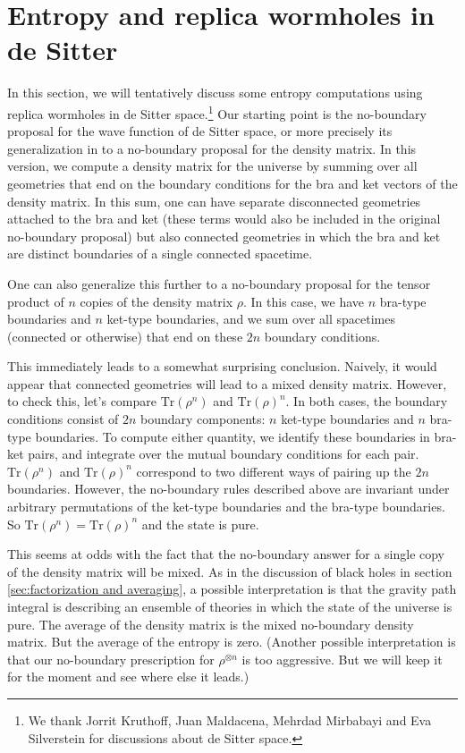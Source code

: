 \documentclass[12pt]{article}
\numberwithin{equation}{section}
\def\tr{\text{Tr}}
\begin{document}
\section{Entropy and replica wormholes in de Sitter}\label{sec:desitter}
In this section, we will tentatively discuss some entropy computations using replica wormholes in de Sitter space.\footnote{We thank Jorrit Kruthoff, Juan Maldacena, Mehrdad Mirbabayi and Eva Silverstein for discussions about de Sitter space.} Our starting point is the no-boundary proposal \cite{PhysRevD.28.2960} for the wave function of de Sitter space, or more precisely its generalization in \cite{PhysRevD.34.2267,barvinsky2008density,Maldacena:2019cbz,maldacenaStrings2019} to a no-boundary proposal for the density matrix. In this version, we compute a density matrix for the universe by summing over all geometries that end on the boundary conditions for the bra and ket vectors of the density matrix. In this sum, one can have separate disconnected geometries attached to the bra and ket (these terms would also be included in the original no-boundary proposal) but also connected geometries in which the bra and ket are distinct boundaries of a single connected spacetime. 

One can also generalize this further to a no-boundary proposal for the tensor product of $n$  copies of the density matrix $\rho$. In this case, we have $n$ bra-type boundaries and $n$ ket-type boundaries, and we sum over all spacetimes (connected or otherwise) that end on these $2n$ boundary conditions. 

This immediately leads to a somewhat surprising conclusion. Naively, it would appear that connected geometries will lead to a mixed density matrix. However, to check this, let's compare $\tr(\rho^n)$ and $\tr(\rho)^n$. In both cases, the boundary conditions consist of $2n$ boundary components: $n$ ket-type boundaries and $n$ bra-type boundaries. To compute either quantity, we identify these boundaries in bra-ket pairs, and integrate over the mutual boundary conditions for each pair. $\tr(\rho^n)$ and $\tr(\rho)^n$ correspond to two different ways of pairing up the $2n$ boundaries. However, the no-boundary rules described above are invariant under arbitrary permutations of the ket-type boundaries and the bra-type boundaries. So $\tr(\rho^n) = \tr(\rho)^n$ and the state is pure.

This seems at odds with the fact that the no-boundary answer for a single copy of the density matrix will be mixed. As in the discussion of black holes in section \ref{sec:factorization and averaging}, a possible interpretation is that the gravity path integral is describing an ensemble of theories in which the state of the universe is pure. The average of the density matrix is the mixed no-boundary density matrix. But the average of the entropy is zero. (Another possible interpretation is that our no-boundary prescription for $\rho^{\otimes n}$ is too aggressive. But we will keep it for the moment and see where else it leads.)
\end{document}

